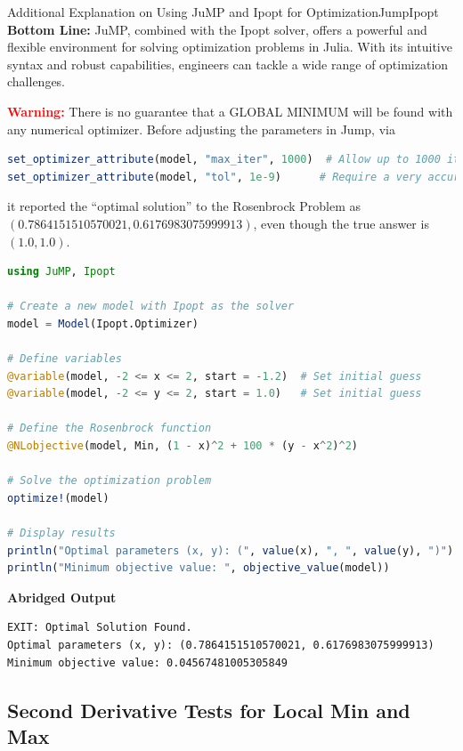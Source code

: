 \begin{methodColor}{Additional Explanation on Using JuMP and Ipopt for Optimization}{JumpIpopt}
\textbf{Bottom Line:} JuMP, combined with the Ipopt solver, offers a powerful and flexible environment for solving optimization problems in Julia. With its intuitive syntax and robust capabilities, engineers can tackle a wide range of optimization challenges.
\end{methodColor}

\bigskip
\textcolor{red}{\bf \Large Warning:} There is no guarantee that a GLOBAL MINIMUM will be found with any numerical optimizer. Before adjusting the parameters in Jump, via
\begin{lstlisting}[language=Julia,style=mystyle]
set_optimizer_attribute(model, "max_iter", 1000)  # Allow up to 1000 iterations
set_optimizer_attribute(model, "tol", 1e-9)      # Require a very accurate solution
\end{lstlisting}
it reported the ``optimal solution'' to the Rosenbrock Problem as $(0.7864151510570021, 0.6176983075999913)$, even though the true answer is $(1.0, 1.0)$.

\begin{lstlisting}[language=Julia,style=mystyle]
using JuMP, Ipopt

# Create a new model with Ipopt as the solver
model = Model(Ipopt.Optimizer)

# Define variables
@variable(model, -2 <= x <= 2, start = -1.2)  # Set initial guess
@variable(model, -2 <= y <= 2, start = 1.0)   # Set initial guess

# Define the Rosenbrock function
@NLobjective(model, Min, (1 - x)^2 + 100 * (y - x^2)^2)

# Solve the optimization problem
optimize!(model)

# Display results
println("Optimal parameters (x, y): (", value(x), ", ", value(y), ")")
println("Minimum objective value: ", objective_value(model))

\end{lstlisting}
\textbf{Abridged Output} 
\begin{verbatim}
EXIT: Optimal Solution Found.
Optimal parameters (x, y): (0.7864151510570021, 0.6176983075999913)
Minimum objective value: 0.04567481005305849
\end{verbatim}

\bigskip


\subsection{Second Derivative Tests for Local Min and Max}

